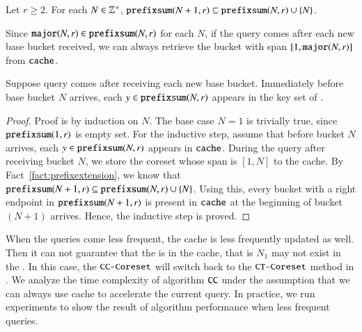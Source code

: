 \begin{fact}
  \label{fact:prefixextension}
  Let $r \geq 2$. For each $N \in {\ensuremath{\mathbb{Z}}}^+$,
  $\texttt{prefixsum}(N+1, r) \subseteq \texttt{prefixsum}(N,r) \cup \{ N \}$.
\end{fact}

Since $\texttt{major}(N,r) \in \texttt{prefixsum}(N,r)$ for each $N$, 
if the query comes after each new base bucket received,
we can always retrieve the bucket with span $[1,\texttt{major}(N,r)]$ from $\texttt{cache}$.

\begin{lemma}
\label{lemma:cache correctness}
Suppose query comes after receiving each new base bucket. 
Immediately before base bucket $N$ arrives, each $y \in \texttt{prefixsum}(N,r)$ appears in the key set of \cache.
\end{lemma}
\begin{proof}
Proof is by induction on $N$. 
The base case $N=1$ is trivially true, since $\texttt{prefixsum}(1,r)$ is empty set. 
For the inductive step, assume that before bucket $N$ arrives, 
each $y \in \texttt{prefixsum}(N, r)$ appears in $\texttt{cache}$. 
During the query after receiving bucket $N$, 
we store the coreset whose span is $[1, N]$ to the cache.
By Fact~\ref{fact:prefixextension}, we know that
$\texttt{prefixsum}(N+1, r) \subseteq \texttt{prefixsum}(N,r) \cup \{N\}$. 
Using this, every bucket with a right endpoint in $\texttt{prefixsum}(N+1,r)$ 
is present in $\texttt{cache}$ at the beginning of bucket $(N+1)$ arrives. 
Hence, the inductive step is proved.
\end{proof}

When the queries come less frequent, the cache is less frequently updated as well. 
Then it can not guarantee that the \major is in the cache, that is $N_1$ may not 
exist in the \cache. In this case, the $\texttt{CC-Coreset}$ will switch back to the $\texttt{CT-Coreset}$ method in \ct. 
We analyze the time complexity of algorithm $\texttt{CC}$ under the assumption that we can always use cache 
to accelerate the current query. In practice, we run experiments to show the result of 
algorithm performance when less frequent queries.


